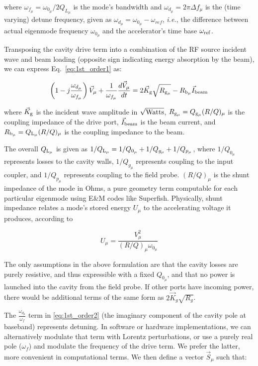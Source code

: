 \documentclass[a4paper,12pt]{article}
\begin{document}
\noindent where $\omega_{f_{\mu}}=\omega_{0_{\mu}}/2Q_{L_{\mu}}$ is the mode's bandwidth and $\omega_{d_{\mu}}=2\pi\Delta f_{\mu}$ is the (time varying) detune frequency, given as $\omega_{d_{\mu}}=\omega_{0_{\mu}}-\omega_{ref}$, {\it i.e.}, the difference between actual eigenmode frequency $\omega_{0_{\mu}}$ and the accelerator's time base $\omega_{\rm ref}$.

Transposing the cavity drive term into a combination of the RF source incident wave and beam loading (opposite sign indicating energy absorption by the beam), we can express Eq.~\ref{eq:1st_order1} as:

\begin{equation}
  \left(1-j\frac{\omega_{d_{\mu}}}{\omega_{f_{\mu}}}\right)\vec V_{\mu} + {\frac{1}{\omega_{f_{\mu}}}}\frac{d\vec V_{\mu}}{dt} =  2\vec K_{\rm g}\sqrt{R_{\rm g_{\mu}}} - R_{\rm b_{\mu}}\vec I_{\rm beam}
  \label{eq:1st_order2}
\end{equation}

\noindent where $\vec K_{\rm g}$ is the incident wave amplitude in $\sqrt{\rm Watts}$, $R_{\rm g_{\mu}}=Q_{\rm g_{\mu}}(R/Q)_{\mu}$ is the coupling impedance of the drive port, $\vec I_{\rm beam}$ is the beam current, and $R_{\rm b_{\mu}}=Q_{\rm L_{\mu}}(R/Q)_{\mu}$ is the coupling impedance to the beam.

The overall $Q_{\rm L_{\mu}}$ is given as $1/Q_{\rm L_{\mu}}=1/Q_{0_{\mu}}+1/Q_{g_{\mu}}+1/Q_{p_{\mu}}$, where $1/Q_{0_{\mu}}$ represents losses to the cavity walls, $1/Q_{g_{\mu}}$ represents coupling to the input coupler, and $1/Q_{p_{\mu}}$ represents coupling to the field probe. $(R/Q)_{\mu}$ is the shunt impedance of the mode in Ohms, a pure geometry term computable for each particular eigenmode using E\&M codes like Superfish. Physically, shunt impedance relates a mode's stored energy $U_{\mu}$ to the accelerating voltage it produces, according to

\begin{equation}
  U_{\mu} = \frac{V_{\mu}^2}{(R/Q)_{\mu}\omega_{0_{\mu}}}
\end{equation}

The only assumptions in the above formulation are that the cavity losses are purely resistive, and thus expressible with a fixed $Q_{0_{\mu}}$, and that no power is launched into the cavity from the field probe.  If other ports have incoming power, there would be additional terms of the same form as $2\vec K_g\sqrt{R_g}$.

The $\frac{\omega_{d_\mu}}{\omega_{f}}$ term in \ref{eq:1st_order2} (the imaginary component of the cavity pole at baseband) represents detuning. In software or hardware implementations, we can alternatively modulate that term with Lorentz perturbations, or use a purely real pole ($\omega_f$) and modulate the frequency of the drive term. We prefer the latter, more convenient in computational terms. We then define a vector $\vec{S}_{\mu}$ such that:
\end{document}
